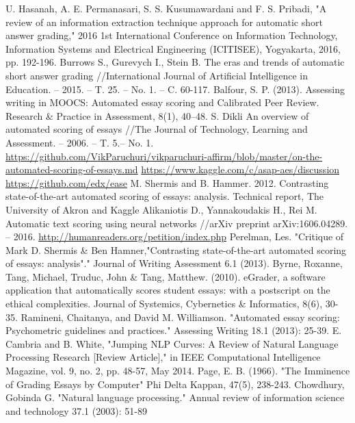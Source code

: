 \documentclass[11pt]{report}
\numberwithin{equation}{section} %
\begin{document}
\begin{thebibliography}{3}
 U. Hasanah, A. E. Permanasari, S. S. Kusumawardani and F. S. Pribadi, "A review of an information extraction technique approach for automatic short answer grading," 2016 1st International Conference on Information Technology, Information Systems and Electrical Engineering (ICITISEE), Yogyakarta, 2016, pp. 192-196.
 Burrows S., Gurevych I., Stein B. The eras and trends of automatic short answer grading //International Journal of Artificial Intelligence in Education. -- 2015. -- T. 25. -- No. 1. -- C. 60-117.
 Balfour, S. P. (2013). Assessing writing in MOOCS: Automated essay scoring and Calibrated Peer Review. Research \& Practice in Assessment, 8(1), 40--48.
 S. Dikli  An overview of automated scoring of essays //The Journal of Technology, Learning and Assessment. -- 2006. -- T. 5.-- No. 1.
 \url{https://github.com/VikParuchuri/vikparuchuri-affirm/blob/master/on-the-automated-scoring-of-essays.md}
 \url{https://www.kaggle.com/c/asap-aes/discussion}
 \url{https://github.com/edx/ease}
 M. Shermis and B. Hammer. 2012. Contrasting state-of-the-art automated scoring of essays: analysis. Technical report, The University of Akron and Kaggle
 Alikaniotis D., Yannakoudakis H., Rei M. Automatic text scoring using neural networks //arXiv preprint arXiv:1606.04289. – 2016.
 \url{http://humanreaders.org/petition/index.php}
 Perelman, Les. "Critique of Mark D. Shermis \& Ben Hamner,"Contrasting state-of-the-art automated scoring of essays: analysis"." Journal of Writing Assessment 6.1 (2013).
 Byrne, Roxanne, Tang, Michael, Truduc, John \& Tang, Matthew. (2010). eGrader, a software application that automatically scores student essays: with a postscript on the ethical complexities. Journal of Systemics, Cybernetics \& Informatics, 8(6), 30-35.
 Ramineni, Chaitanya, and David M. Williamson. "Automated essay scoring: Psychometric guidelines and practices." Assessing Writing 18.1 (2013): 25-39. 
 E. Cambria and B. White, "Jumping NLP Curves: A Review of Natural Language Processing Research [Review Article]," in IEEE Computational Intelligence Magazine, vol. 9, no. 2, pp. 48-57, May 2014.
  Page, E. B. (1966). "The Imminence of Grading Essays by Computer" Phi Delta Kappan, 47(5), 238-243.
 Chowdhury, Gobinda G. "Natural language processing." Annual review of information science and technology 37.1 (2003): 51-89

\end{thebibliography}
\end{document}
